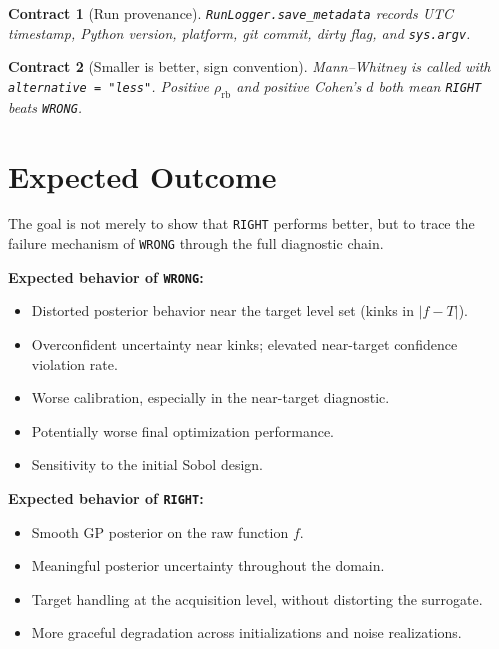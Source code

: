 \documentclass[11pt]{article}
\newtheorem{contract}{Contract}
\newcommand{\RIGHT}{\texttt{RIGHT}}
\newcommand{\WRONG}{\texttt{WRONG}}
\begin{document}
\begin{contract}[Run provenance]
\texttt{RunLogger.save\_metadata} records UTC timestamp, Python version, platform,
git commit, dirty flag, and \texttt{sys.argv}.
\end{contract}
 
\begin{contract}[Smaller is better, sign convention]
Mann--Whitney is called with \texttt{alternative = "less"}.
Positive $\rho_{\mathrm{rb}}$ and positive Cohen's $d$ both mean \RIGHT{} beats
\WRONG{}.
\end{contract}
 
\section{Expected Outcome}
\label{sec:expected}
 
The goal is not merely to show that \RIGHT{} performs better, but to trace the failure
mechanism of \WRONG{} through the full diagnostic chain.
 
\textbf{Expected behavior of \WRONG:}
\begin{itemize}
  \item Distorted posterior behavior near the target level set (kinks in $|f-T|$).
  \item Overconfident uncertainty near kinks; elevated near-target confidence
        violation rate.
  \item Worse calibration, especially in the near-target diagnostic.
  \item Potentially worse final optimization performance.
  \item Sensitivity to the initial Sobol design.
\end{itemize}
 
\textbf{Expected behavior of \RIGHT:}
\begin{itemize}
  \item Smooth GP posterior on the raw function $f$.
  \item Meaningful posterior uncertainty throughout the domain.
  \item Target handling at the acquisition level, without distorting the surrogate.
  \item More graceful degradation across initializations and noise realizations.
\end{itemize}
 
\end{document}
